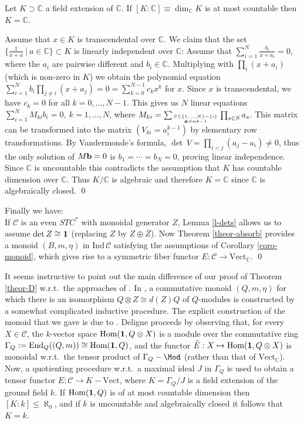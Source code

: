 \documentclass[11pt]{article}
\theoremstyle{definition}
\theoremstyle{definition}
\theoremstyle{remark}
\newcommand{\Vect}{\mathrm{Vect}}
\def\2#1{{\mathcal #1}}
\def\7#1{{\mathbb #1}}
\def\1#1{{\bf #1}}
\def\ol#1{{\overline #1}}
\newcommand{\Hom}{\mathrm{Hom}}
\newcommand{\End}{\mathrm{End}}
\newcommand{\rarr}{\rightarrow}
\begin{document}
\blemma \label{lem-extC} 
Let $K\supset\7C$ a field extension of $\7C$. If $[K:\7C]\equiv\dim_\7CK$ is at most countable then
$K=\7C$.
\elemma

\prf Assume that $x\in K$ is transcendental over $\7C$. We claim that the set 
$\{ \frac{1}{x+a}\ | \ a\in\7C\}\subset K$ is linearly independent over $\7C$: Assume that
$\sum_{i=1}^N \frac{b_i}{x+a_i}=0$, where  the $a_i$ are pairwise different and $b_i\in\7C$.  
Multiplying with $\prod_i(x+a_i)$ (which is non-zero in $K$) we obtain the polynomial equation
$\sum_{i=1}^N b_i\prod_{j\ne i}(x+a_j)=0=\sum_{k=0}^{N-1}c_kx^k$ for $x$. Since $x$ is
transcendental, we have $c_k=0$ for all $k=0,\ldots,N-1$. This gives us $N$ linear equations
$\sum_{i=1}^N M_{ki}b_i=0,\ k=1,\ldots,N$, where
$M_{ki}= \sum_{S\subset\{1,\ldots,N\}-\{i\} \atop \# S={k-1}} \prod_{s\in S}a_s$. This matrix can be
transformed into the matrix $(V_{ki}=a_i^{k-1})$ by elementary row transformations. By Vandermonde's
formula, $\det\,V=\prod_{i<j}(a_j-a_i)\ne 0$, thus the only solution of $M{\bf b}=0$ is
$b_1=\cdots=b_N=0$, proving linear independence. Since $\7C$ is uncountable this contradicts the
assumption that $K$ has countable dimension over $\7C$. Thus $K/\7C$ is algebraic and therefore
$K=\7C$ since $\7C$ is algebraically closed.  
\qed

Finally we have: \\

 If $\2C$ is an even $STC^*$ with monoidal generator
$Z$, Lemma \ref{l-dets} allows us to assume $\det Z\cong\11$ (replacing $Z$ by $Z\oplus\ol{Z}$). Now
Theorem \ref{theor-absorb} provides a monoid $(B,m,\eta)$ in $\mathrm{Ind}\,\2C$ satisfying the
assumptions of Corollary \ref{coro-monoid}, which gives rise to a symmetric fiber functor
$E:\2C\rarr\Vect_\7C$. 
\qed

\brem \label{rem-new} 
It seems instructive to point out the main difference of our proof of Theorem \ref{theor-D} w.r.t.\
the approaches of \cite{del,bichon}. In \cite{del}, a commutative monoid $(Q,m,\eta)$ for which
there is an isomorphism $Q\otimes Z\cong d(Z)Q$ of $Q$-modules is constructed by a somewhat
complicated inductive procedure. The explicit construction of the monoid that we gave is due to
\cite{bichon}. Deligne proceeds by observing that, for every $X\in\2C$, the $k$-vector space
$\Hom(\11,Q\otimes X)$ is a module over the commutative ring
$\Gamma_Q:=\End_Q((Q,m))\cong\Hom(\11,Q)$, and the functor $\tilde{E}: X\mapsto\Hom(\11,Q\otimes X)$
is monoidal w.r.t.\ the tensor product of $\Gamma_Q-\Mod$ (rather than that of $\Vect_\7C$). 
Now, a quotienting procedure w.r.t.\ a maximal ideal $J$ in $\Gamma_Q$ is used to obtain a tensor
functor $E: \2C\rarr K-\Vect$, where $K=\Gamma_Q/J$ is a field extension of the ground field $k$. If
$\Hom(\11,Q)$ is of at most countable dimension then $[K:k]\le\aleph_0$, and if $k$ is uncountable
and algebraically closed it follows that $K=k$.  
\end{document}
